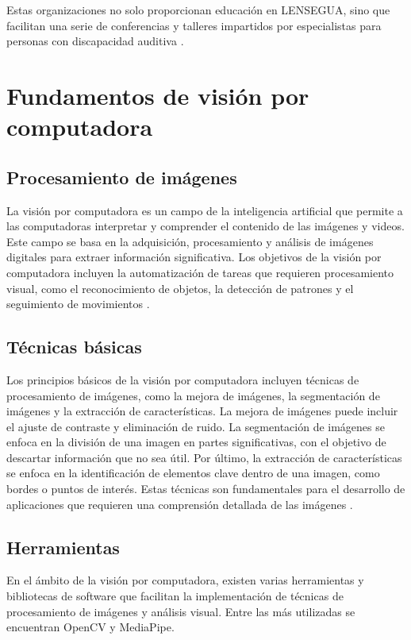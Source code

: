 Estas organizaciones no solo proporcionan educación en LENSEGUA, sino que facilitan una serie de conferencias y talleres impartidos por especialistas para personas con discapacidad auditiva \cite{LenseguaSF}.









\section{Fundamentos de visión por computadora}

\subsection{Procesamiento de imágenes}
La visión por computadora es un campo de la inteligencia artificial que permite a las computadoras interpretar y comprender el contenido de las imágenes y videos.
Este campo se basa en la adquisición, procesamiento y análisis de imágenes digitales para extraer información significativa.
Los objetivos de la visión por computadora incluyen la automatización de tareas que requieren procesamiento visual, como el reconocimiento de objetos, la detección de patrones y el seguimiento de movimientos \cite{forsyth2012}.

\subsection{Técnicas básicas}
Los principios básicos de la visión por computadora incluyen técnicas de procesamiento de imágenes, como la mejora de imágenes, la segmentación de imágenes y la extracción de características.
La mejora de imágenes puede incluir el ajuste de contraste y eliminación de ruido.
La segmentación de imágenes se enfoca en la división de una imagen en partes significativas, con el objetivo de descartar información que no sea útil.
Por último, la extracción de características se enfoca en la identificación de elementos clave dentro de una imagen, como bordes o puntos de interés.
Estas técnicas son fundamentales para el desarrollo de aplicaciones que requieren una comprensión detallada de las imágenes \cite{aakanksha2020}.

\subsection{Herramientas}
En el ámbito de la visión por computadora, existen varias herramientas y bibliotecas de software que facilitan la implementación de técnicas de procesamiento de imágenes y análisis visual.
Entre las más utilizadas se encuentran OpenCV y MediaPipe.

